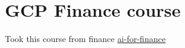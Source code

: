 

\section{GCP Finance course}

Took this course from finance
\href{https://github.com/GoogleCloudPlatform/training-data-analyst/tree/master/courses/ai-for-finance}{ai-for-finance}